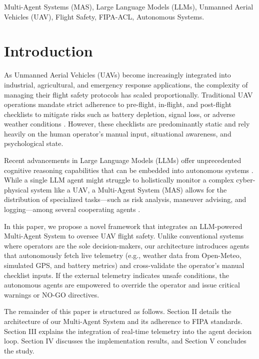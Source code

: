 \documentclass[conference]{IEEEtran}
\begin{document}
\begin{IEEEkeywords}
Multi-Agent Systems (MAS), Large Language Models (LLMs), Unmanned Aerial Vehicles (UAV), Flight Safety, FIPA-ACL, Autonomous Systems.
\end{IEEEkeywords}

\section{Introduction}
As Unmanned Aerial Vehicles (UAVs) become increasingly integrated into industrial, agricultural, and emergency response applications, the complexity of managing their flight safety protocols has scaled proportionally. Traditional UAV operations mandate strict adherence to pre-flight, in-flight, and post-flight checklists to mitigate risks such as battery depletion, signal loss, or adverse weather conditions \cite{b1}. However, these checklists are predominantly static and rely heavily on the human operator's manual input, situational awareness, and psychological state.

Recent advancements in Large Language Models (LLMs) offer unprecedented cognitive reasoning capabilities that can be embedded into autonomous systems \cite{b2}. While a single LLM agent might struggle to holistically monitor a complex cyber-physical system like a UAV, a Multi-Agent System (MAS) allows for the distribution of specialized tasks—such as risk analysis, maneuver advising, and logging—among several cooperating agents \cite{b3}. 

In this paper, we propose a novel framework that integrates an LLM-powered Multi-Agent System to oversee UAV flight safety. Unlike conventional systems where operators are the sole decision-makers, our architecture introduces agents that autonomously fetch live telemetry (e.g., weather data from Open-Meteo, simulated GPS, and battery metrics) and cross-validate the operator's manual checklist inputs. If the external telemetry indicates unsafe conditions, the autonomous agents are empowered to override the operator and issue critical warnings or NO-GO directives.

The remainder of this paper is structured as follows. Section II details the architecture of our Multi-Agent System and its adherence to FIPA standards. Section III explains the integration of real-time telemetry into the agent decision loop. Section IV discusses the implementation results, and Section V concludes the study.
\end{document}

